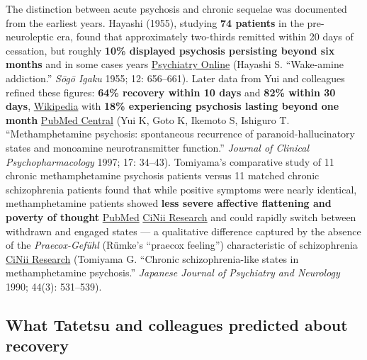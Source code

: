 The distinction between acute psychosis and chronic sequelae was documented from the earliest years. Hayashi (1955), studying \textbf{74 patients} in the pre-neuroleptic era, found that approximately two-thirds remitted within 20 days of cessation, but roughly \textbf{10\% displayed psychosis persisting beyond six months} and in some cases years \href{https://psychiatryonline.org/doi/10.1176/appi.ajp.2009.08111695}{Psychiatry Online} (Hayashi S. ``Wake-amine addiction.'' \emph{Sōgō Igaku} 1955; 12: 656--661). Later data from Yui and colleagues refined these figures: \textbf{64\% recovery within 10 days} and \textbf{82\% within 30 days}, \href{https://ja.wikipedia.org/wiki/\%E7\%B2\%BE\%E7\%A5\%9E\%E5\%88\%BA\%E6\%BF\%80\%E8\%96\%AC\%E7\%B2\%BE\%E7\%A5\%9E\%E7\%97\%85}{Wikipedia} with \textbf{18\% experiencing psychosis lasting beyond one month} \href{https://pmc.ncbi.nlm.nih.gov/articles/PMC4766712/}{PubMed Central} (Yui K, Goto K, Ikemoto S, Ishiguro T. ``Methamphetamine psychosis: spontaneous recurrence of paranoid-hallucinatory states and monoamine neurotransmitter function.'' \emph{Journal of Clinical Psychopharmacology} 1997; 17: 34--43). Tomiyama's comparative study of 11 chronic methamphetamine psychosis patients versus 11 matched chronic schizophrenia patients found that while positive symptoms were nearly identical, methamphetamine patients showed \textbf{less severe affective flattening and poverty of thought} \href{https://pubmed.ncbi.nlm.nih.gov/2074612/}{PubMed} \href{https://cir.nii.ac.jp/crid/1050570022170482432}{CiNii Research} and could rapidly switch between withdrawn and engaged states --- a qualitative difference captured by the absence of the \emph{Praecox-Gefühl} (Rümke's ``praecox feeling'') characteristic of schizophrenia \href{https://cir.nii.ac.jp/crid/1050570022170482432}{CiNii Research} (Tomiyama G. ``Chronic schizophrenia-like states in methamphetamine psychosis.'' \emph{Japanese Journal of Psychiatry and Neurology} 1990; 44(3): 531--539).

\subsection{What Tatetsu and colleagues predicted about recovery}\label{12_philopon-what-tatetsu-and-colleagues-predicted-about-recovery}


